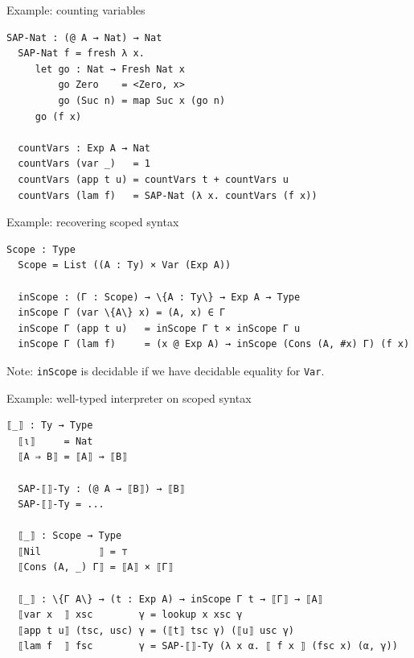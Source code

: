 \documentclass[dvipsnames,aspectratio=169]{beamer}
\newcommand{\vsp}{\vspace{1em}}
\theoremstyle{remark}
\begin{document}
\begin{frame}[fragile]{Example: counting variables}

\begin{Verbatim}[commandchars=\\\{\}]
  SAP-Nat : (@ A → Nat) → Nat
  SAP-Nat f = fresh λ x.
     let go : Nat → Fresh Nat x
         go Zero    = <Zero, x>
         go (Suc n) = map Suc x (go n)
     go (f x)

  countVars : Exp A → Nat
  countVars (var _)   = 1
  countVars (app t u) = countVars t + countVars u
  countVars (lam f)   = SAP-Nat (λ x. countVars (f x))
\end{Verbatim}

\end{frame}

\begin{frame}[fragile]{Example: recovering scoped syntax}

\begin{Verbatim}[commandchars=\\\{\}]
  Scope : Type
  Scope = List ((A : Ty) × Var (Exp A))

  inScope : (Γ : Scope) → \{A : Ty\} → Exp A → Type
  inScope Γ (var \{A\} x) = (A, x) ∈ Γ
  inScope Γ (app t u)   = inScope Γ t × inScope Γ u
  inScope Γ (lam f)     = (x @ Exp A) → inScope (Cons (A, #x) Γ) (f x)
\end{Verbatim}
\vsp

Note: \texttt{inScope} is decidable if we have decidable equality for \texttt{Var}.

\end{frame}


\begin{frame}[fragile]{Example: well-typed interpreter on scoped syntax}

\begin{Verbatim}[commandchars=\\\{\}]
  ⟦_⟧ : Ty → Type
  ⟦ι⟧     = Nat
  ⟦A ⇒ B⟧ = ⟦A⟧ → ⟦B⟧

  SAP-⟦⟧-Ty : (@ A → ⟦B⟧) → ⟦B⟧
  SAP-⟦⟧-Ty = ...

  ⟦_⟧ : Scope → Type
  ⟦Nil          ⟧ = ⊤
  ⟦Cons (A, _) Γ⟧ = ⟦A⟧ × ⟦Γ⟧

  ⟦_⟧ : \{Γ A\} → (t : Exp A) → inScope Γ t → ⟦Γ⟧ → ⟦A⟧
  ⟦var x  ⟧ xsc        γ = lookup x xsc γ
  ⟦app t u⟧ (tsc, usc) γ = (⟦t⟧ tsc γ) (⟦u⟧ usc γ)
  ⟦lam f  ⟧ fsc        γ = SAP-⟦⟧-Ty (λ x α. ⟦ f x ⟧ (fsc x) (α, γ))
\end{Verbatim}

\end{frame}
\end{document}
